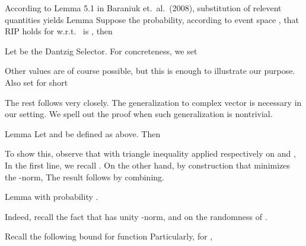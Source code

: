 According to Lemma 5.1 in Baraniuk et.\ al.\ (2008), substitution of relevent quantities yields
\Result
{Lemma}
{
Suppose the probability, according to event space , that RIP holds for  w.r.t.\  is , then
}

\stopsection

\startsection [title={Expected Error Analysis for Complex-Case Dantzig Selector}]


Let  be the Dantzig Selector.
For concreteness, we set

Other values are of course possible, but this is enough to illustrate our purpose.
Also set for short

The rest follows  very closely.
The generalization to complex vector is necessary in our setting.
We spell out the proof when such generalization is nontrivial.

\Result
{Lemma}
{
Let  and  be defined as above.
Then
}

To show this, observe that with triangle inequality applied respectively on  and ,
In the first line, we recall .
On the other hand, by construction that  minimizes the -norm,
The result follows by combining.

\Result
{Lemma}
{
with probability .
}

Indeed, recall the fact that  has unity -norm, and on the randomness of .

Recall the following bound for  function
Particularly, for ,

